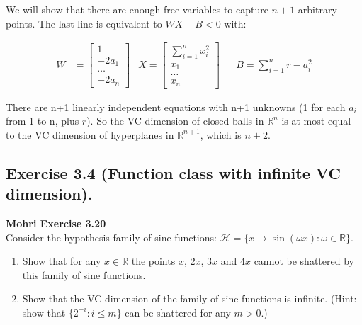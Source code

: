 \documentclass[
10pt, %
a4paper, %
oneside, %
headinclude,footinclude, %
BCOR5mm, %
]{scrartcl}
\newenvironment{problem}[2][]
               { \begin{mdframed}[backgroundcolor=gray!20] \textbf{#1 #2} \\}
               {  \end{mdframed}}
\begin{document}
We will show that there are enough free variables to capture $n+1$ arbitrary points. The last line is equivalent to $WX - B < 0$ with:

\begin{align*}
  W &= \begin{bmatrix}
    1 \\
    -2a_1 \\
    \ldots \\
    -2a_n
   \end{bmatrix} & X = \begin{bmatrix}
     \sum_{i=1}^n x_i^2 \\
     x_1 \\
     \ldots \\
     x_n
   \end{bmatrix} &&  B = \sum_{i=1}^n r - a_i^2
\end{align*}

There are n+1 linearly independent equations with n+1 unknowns (1 for each $a_i$ from 1 to n, plus $r$). So the VC dimension of closed balls in $\mathbb{R}^n$ is at most equal to the VC dimension of hyperplanes in $\mathbb{R}^{n+1}$, which is $n+2$.
\newpage
\subsection*{Exercise 3.4 (Function class with infinite VC dimension).}
\begin{problem}{Mohri Exercise 3.20}
Consider the hypothesis family of sine functions: $\mathcal{H} = \{x \to \sin(\omega x): \omega \in \mathbb{R}\}$.
\begin{enumerate}[label= (\alph*)]
\item Show that for any $x \in \mathbb{R}$ the points $x$, $2x$, $3x$ and $4x$ cannot be shattered by this family of sine functions.
\item Show that the VC-dimension of the family of sine functions is infinite. (Hint: show that $\{2^{-i}: i \leq m\}$ can be shattered for any $m > 0$.)
\end{enumerate}
\end{problem}
\end{document}
